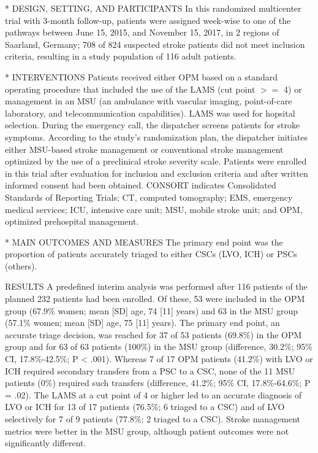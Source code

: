 \begin{markdown}
* DESIGN, SETTING, AND PARTICIPANTS In this randomized multicenter trial with 3-month follow-up, patients were assigned week-wise to one of the pathways between June 15, 2015, and November 15, 2017, in 2 regions of Saarland, Germany; 708 of 824 suspected stroke patients did not meet inclusion criteria, resulting in a study population of 116 adult patients.

* INTERVENTIONS Patients received either OPM based on a standard operating procedure that included the use of the LAMS (cut point $>=$ 4) or management in an MSU (an ambulance with vascular imaging, point-of-care laboratory, and telecommunication capabilities). LAMS was used for hopsital selection. During the emergency call, the dispatcher screens patients for stroke symptoms. According to the study’s randomization plan, the dispatcher initiates either MSU-based stroke management or conventional stroke management optimized by the use of a preclinical stroke severity scale. Patients were enrolled in this trial after evaluation for inclusion and exclusion criteria and after written informed consent had been obtained. CONSORT indicates Consolidated Standards of Reporting Trials; CT, computed tomography; EMS, emergency medical services; ICU, intensive care unit; MSU, mobile stroke unit; and OPM, optimized prehospital management. 

* MAIN OUTCOMES AND MEASURES The primary end point was the proportion of patients accurately triaged to either CSCs (LVO, ICH) or PSCs (others). 

RESULTS A predefined interim analysis was performed after 116 patients of the planned 232 patients had been enrolled. Of these, 53 were included in the OPM group (67.9\% women; mean [SD] age, 74 [11] years) and 63 in the MSU group (57.1\% women; mean [SD] age, 75 [11] years). The primary end point, an accurate triage decision, was reached for 37 of 53 patients (69.8\%) in the OPM group and for 63 of 63 patients (100\%) in the MSU group (difference, 30.2\%; 95\% CI, 17.8\%-42.5\%; P < .001). Whereas 7 of 17 OPM patients (41.2\%) with LVO or ICH required secondary transfers from a PSC to a CSC, none of the 11 MSU patients (0\%) required such transfers (difference, 41.2\%; 95\% CI, 17.8\%-64.6\%; P = .02). The LAMS at a cut point of 4 or higher led to an accurate diagnosis of LVO or ICH for 13 of 17 patients (76.5\%; 6 triaged to a CSC) and of LVO selectively for 7 of 9 patients (77.8\%; 2 triaged to a CSC). Stroke management metrics were better in the MSU group, although patient outcomes were not significantly different.

\end{markdown}

